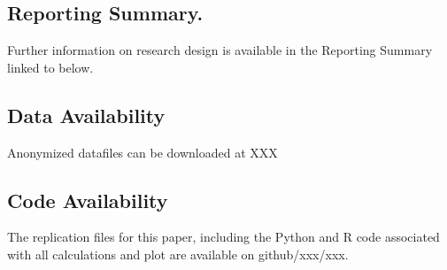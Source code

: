 \documentclass[9pt,a4paper,twocolumn,lineno]{article}
\begin{document}
\subsection*{Reporting Summary.} \small Further information on research design is available in the Reporting Summary linked to below.

\subsection*{Data Availability}
\small Anonymized datafiles can be downloaded at XXX

\subsection*{Code Availability}
\small The replication files for this paper, including the Python and R code associated with all calculations and plot are available on github/xxx/xxx.
\end{document}
